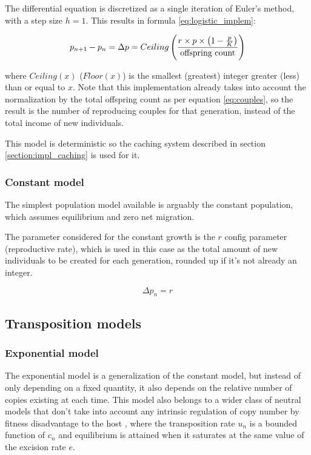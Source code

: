 \documentclass[10pt]{article}
\begin{document}
The differential equation is discretized as a single iteration of
Euler's method, with a step size $h=1$. This results in formula
\eqref{eq:logistic_implem}:

\begin{equation}
  \label{eq:logistic_implem}
  p_{n+1} - p_n = \Delta p = Ceiling \left(  
  \frac{r \times p \times \left(1-\frac{p}{K}\right)}
       {\hbox{offspring count}}  
       \right)
\end{equation}

where $Ceiling(x)$ ($Floor(x)$) is the smallest (greatest) integer
greater (less) than or equal to $x$. Note that this implementation
already takes into account the normalization by the total offspring
count as per equation \eqref{eq:couples}, so the result is the number
of reproducing couples for that generation, instead of the total
income of new individuals.

This model is deterministic so the caching system described in section
\ref{section:impl_caching} is used for it.

\subsubsection{Constant model}

The simplest population model available is arguably the constant
population, which assumes equilibrium and zero net migration. 

The parameter considered for the constant growth is the $r$ config
parameter (reproductive rate), which is used in this case as the total
amount of new individuals to be created for each generation, rounded
up if it's not already an integer.

\begin{equation}
  \Delta p_n = r
\end{equation}


\subsection{Transposition models}
\label{sec:impl_transp_models}
\subsubsection{Exponential model}

The exponential model is a generalization of the constant model, but
instead of only depending on a fixed quantity, it also depends on the
relative number of copies existing at each time. This model also
belongs to a wider class of neutral models that don't take into
account any intrinsic regulation of copy number by fitness
disadvantage to the host \cite{rouzic2005}, where the transposition
rate $u_n$ is a bounded function of $c_n$ and equilibrium is attained
when it saturates at the same value of the excision rate $e$.
\end{document}

